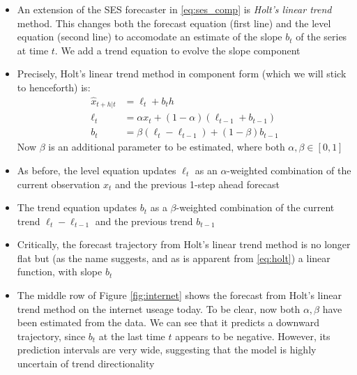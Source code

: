 \documentclass{article}
\begin{document}
\begin{itemize}
\item An extension of the SES forecaster in \eqref{eq:ses_comp} is \emph{Holt's
    linear trend} method. This changes both the forecast equation (first line)
  and the level equation (second line) to accomodate an estimate of the slope
  $b_t$ of the series at time $t$. We add a trend equation to evolve the slope
  component  

\item Precisely, Holt's linear trend method in component form (which we will
  stick to henceforth) is:
  \begin{equation}
  \label{eq:holt}
  \begin{aligned}
  \hat{x}_{t+h | t} &= \ell_t + b_t h \\
  \ell_t &= \alpha x_t + (1-\alpha) (\ell_{t-1} + b_{t-1}) \\
  b_t &= \beta (\ell_t - \ell_{t-1}) + (1-\beta) b_{t-1} 
  \end{aligned}
  \end{equation}
  Now $\beta$ is an additional parameter to be estimated, where both $\alpha,
  \beta \in [0,1]$ 

\item As before, the level equation updates $\ell_t$ as an $\alpha$-weighted
  combination of the current observation $x_t$ and the previous 1-step ahead
  forecast  

\item The trend equation updates $b_t$ as a $\beta$-weighted combination of the
  current trend $\ell_t - \ell_{t-1}$ and the previous trend $b_{t-1}$

\item Critically, the forecast trajectory from Holt's linear trend method is no
  longer flat but (as the name suggests, and as is apparent from
  \eqref{eq:holt}) a linear function, with slope $b_t$

\item The middle row of Figure \ref{fig:internet} shows the forecast from Holt's
  linear trend method on the internet useage today. To be clear, now both
  $\alpha,\beta$ have been estimated from the data. We can see that it predicts
  a downward trajectory, since $b_t$ at the last time $t$ appears to be
  negative. However, its prediction intervals are very wide, suggesting that the 
  model is highly uncertain of trend directionality  
\end{itemize}
\end{document}
